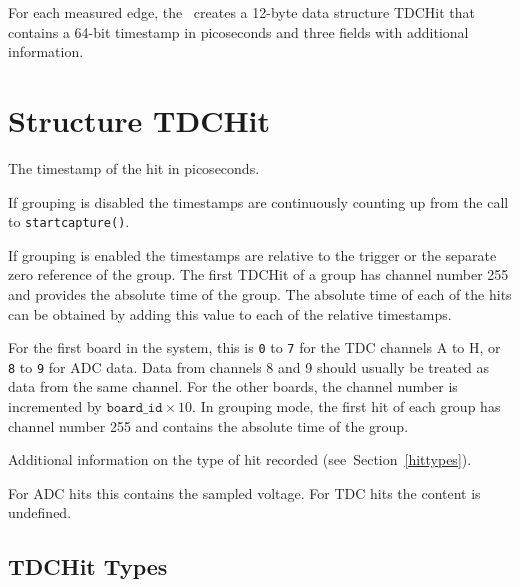 For each measured edge, the \deviceName\ creates a 12-byte data structure
TDCHit that contains a 64-bit timestamp in picoseconds and three fields with
additional information. 

\section{Structure TDCHit}
\label{TDCHit}
\begin{description}[style=nextline]
    \item[\cronvar{int64\_t}{time}]
    The timestamp of the hit in picoseconds. 

    If grouping is disabled the timestamps are continuously counting up from
    the call to \texttt{\prefix start\tu capture()}.

    If grouping is enabled the timestamps are relative to the trigger or the
    separate zero reference of the group.  The first TDCHit of a group has
    channel number 255 and provides the absolute time of the group.  The
    absolute time of each of the hits can be obtained by adding this value to
    each of the relative timestamps.

    \item[\cronvar{uint8\_t}{channel}]
    For the first board in the system, this is \texttt{0} to \texttt{7} for the TDC channels A
    to H, or \texttt{8} to \texttt{9} for ADC data. Data from channels 8 and 9 should usually be
    treated as data from the same channel.  For the other boards, the channel
    number is incremented by $\texttt{board\_id} \times 10$.  In grouping
    mode, the first hit of each group has channel number 255 and contains the
    absolute time of the group.

    \item[\cronvar{uint8\_t}{type}]
    Additional information on the type of hit recorded
    (see~Section~\ref{hittypes}).

    \item[\cronvar{uint16\_t}{bin}]
    For ADC hits this contains the sampled voltage. For TDC hits the content
    is undefined.
\end{description}

\subsection{TDCHit Types \label{hittypes}}
\newcommand{\HTYPE}{\PREFIX TDCHIT\tu TYPE\tu}

